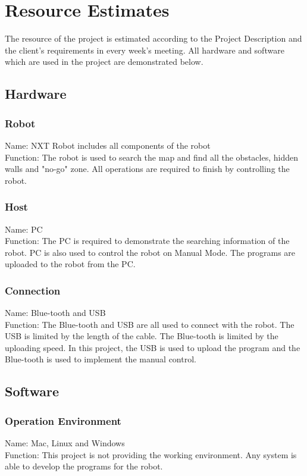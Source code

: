 \documentclass[11pt, a4paper]{report}
\begin{document}
\pagebreak




\chapter{Resource Estimates} %
\label{cha:RE}
The resource of the project is estimated according to the Project Description and the client's requirements in every week's meeting. All hardware and software which are used in the project are demonstrated below.
\section{Hardware}
\subsection{Robot}
Name: NXT Robot includes all components of the robot\\
Function: The robot is used to search the map and find all the obstacles, hidden walls and "no-go" zone. All operations are required to finish by controlling the robot.
\subsection{Host}
Name: PC\\
Function: The PC is required to demonstrate the searching information of the robot. PC is also used to control the robot on Manual Mode. The programs are uploaded to the robot from the PC.
\subsection{Connection}
Name: Blue-tooth and USB \\
Function: The Blue-tooth and USB are all used to connect with the robot. The USB is limited by the length of the cable. The Blue-tooth is limited by the uploading speed. In this project, the USB is used to upload the program and the Blue-tooth is used to implement the manual control.
\section{Software}
\subsection{Operation Environment}
Name: Mac, Linux and Windows\\
Function: This project is not providing the working environment. Any system is able to develop the programs for the robot.
\end{document}
